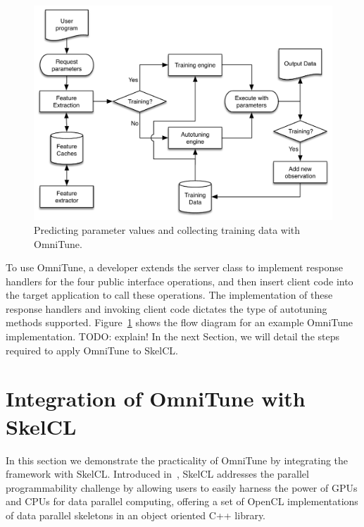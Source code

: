 \documentclass[nonatbib,preprint,9pt]{sigplanconf}
\begin{document}
\begin{figure}
\centering
\includegraphics[width=\columnwidth]{img/omnitune-system-flow.pdf}
\caption[Optimisation parameter selection with OmniTune]{%
  Predicting parameter values and collecting training data with
  OmniTune.%
}
\label{fig:omnitune-system-flow}
\end{figure}

To use OmniTune, a developer extends the server class to implement
response handlers for the four public interface operations, and then
insert client code into the target application to call these
operations. The implementation of these response handlers and invoking
client code dictates the type of autotuning methods
supported. Figure~\ref{fig:omnitune-system-flow} shows the flow
diagram for an example OmniTune implementation. TODO: explain! In the
next Section, we will detail the steps required to apply OmniTune to
SkelCL.


\section{Integration of OmniTune with SkelCL}\label{sec:omnitune-skelcl}

In this section we demonstrate the practicality of OmniTune by
integrating the framework with SkelCL. Introduced
in~\cite{Steuwer2011}, SkelCL addresses the parallel programmability
challenge by allowing users to easily harness the power of GPUs and
CPUs for data parallel computing, offering a set of OpenCL
implementations of data parallel skeletons in an object oriented C++
library.
\end{document}
